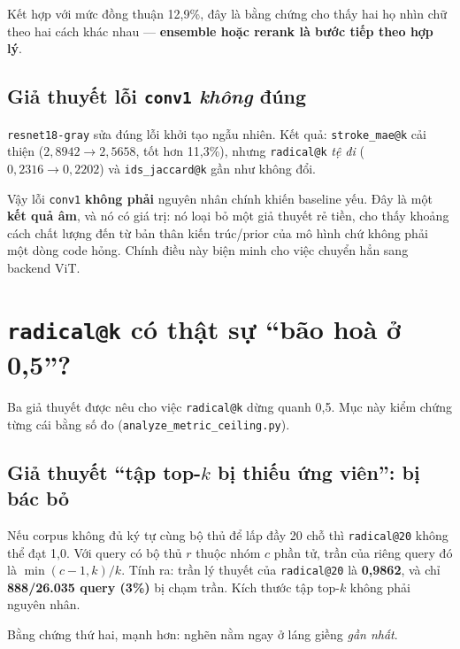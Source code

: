 \documentclass[11pt,a4paper]{article}
\newcommand{\code}[1]{\texttt{#1}}
\begin{document}
Kết hợp với mức đồng thuận 12,9\%, đây là bằng chứng cho thấy hai họ nhìn chữ theo hai cách khác
nhau --- \textbf{ensemble hoặc rerank là bước tiếp theo hợp lý}.

\subsection{Giả thuyết lỗi \code{conv1} \emph{không} đúng}
\label{sec:conv1}

\code{resnet18-gray} sửa đúng lỗi khởi tạo ngẫu nhiên. Kết quả: \code{stroke\_mae@k} cải thiện
($2{,}8942 \to 2{,}5658$, tốt hơn 11,3\%), nhưng \code{radical@k} \emph{tệ đi}
($0{,}2316 \to 0{,}2202$) và \code{ids\_jaccard@k} gần như không đổi.

Vậy lỗi \code{conv1} \textbf{không phải} nguyên nhân chính khiến baseline yếu. Đây là một
\textbf{kết quả âm}, và nó có giá trị: nó loại bỏ một giả thuyết rẻ tiền, cho thấy khoảng cách chất
lượng đến từ bản thân kiến trúc/prior của mô hình chứ không phải một dòng code hỏng. Chính điều này
biện minh cho việc chuyển hẳn sang backend ViT.

\section{\code{radical@k} có thật sự ``bão hoà ở 0,5''?}
\label{sec:tran}

Ba giả thuyết được nêu cho việc \code{radical@k} dừng quanh 0,5. Mục này kiểm chứng từng cái bằng
số đo (\code{analyze\_metric\_ceiling.py}).

\subsection{Giả thuyết ``tập top-$k$ bị thiếu ứng viên'': bị bác bỏ}

Nếu corpus không đủ ký tự cùng bộ thủ để lấp đầy 20 chỗ thì \code{radical@20} không thể đạt 1,0.
Với query có bộ thủ $r$ thuộc nhóm $c$ phần tử, trần của riêng query đó là $\min(c-1,k)/k$. Tính ra:
trần lý thuyết của \code{radical@20} là \textbf{0,9862}, và chỉ \textbf{888/26.035 query (3\%)} bị
chạm trần. Kích thước tập top-$k$ không phải nguyên nhân.

Bằng chứng thứ hai, mạnh hơn: nghẽn nằm ngay ở láng giềng \emph{gần nhất}.
\end{document}
